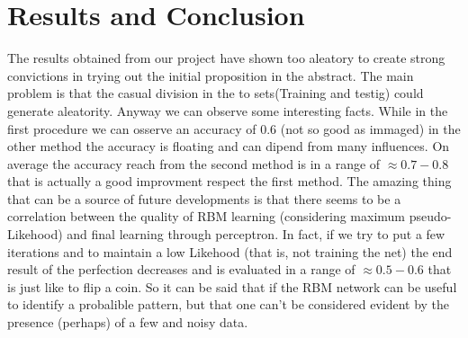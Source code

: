 \documentclass[paper=letter, fontsize=12pt]{article}
\begin{document}
\section{Results and Conclusion}
The results obtained from our project have shown too aleatory to create strong convictions in trying out the initial proposition in the abstract.
The main problem is that the casual division in the to sets(Training and testig) could generate aleatority.\newline 
Anyway we can observe some interesting facts. While in the first procedure we can osserve an accuracy of 0.6 (not so good as immaged) in the other method the accuracy is floating and can dipend from many influences.\newline
On average the accuracy reach from the second method is in a range of $ \approx 0.7-0.8$ that is actually a good improvment respect the first method.
The amazing thing that can be a source of future developments is that there seems to be a correlation between the quality of RBM learning (considering maximum pseudo-Likehood) and final learning through perceptron. In fact, if we try to put a few iterations and to maintain a low Likehood (that is, not training the net) the end result of the perfection decreases and is evaluated in a range of  $\approx 0.5-0.6$ that is just like to flip a coin.
So it can be said that if the RBM network can be useful to identify a probalible pattern, but that one can't be considered evident by the presence (perhaps) of a few and noisy data.
\theendnotes
\end{document}
